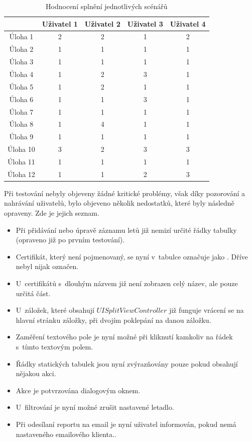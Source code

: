 \documentclass[thesis=M,czech]{FITthesis}[2012/06/26]
\begin{document}
\begin{table}\centering
 \begin{tabular}{ c | c | c | c | c |}
 	 & Uživatel 1 & Uživatel 2 & Uživatel 3 & Uživatel 4 \\
 	\hline
 	Úloha 1  & 2 & 2 & 1 & 2 \\
 	Úloha 2  & 1 & 1 & 1 & 1 \\
 	Úloha 3  & 1 & 1 & 1 & 1 \\
 	Úloha 4  & 1 & 2 & 3 & 1 \\
 	Úloha 5  & 1 & 2 & 1 & 1 \\
 	Úloha 6  & 1 & 1 & 3 & 1 \\
 	Úloha 7  & 1 & 1 & 1 & 1 \\
 	Úloha 8  & 1 & 4 & 1 & 1 \\
 	Úloha 9  & 1 & 1 & 1 & 1 \\
 	Úloha 10 & 3 & 2 & 3 & 3 \\
 	Úloha 11 & 1 & 1 & 1 & 1 \\
 	Úloha 12 & 1 & 1 & 2 & 3 \\
 \end{tabular}
 \caption[Hodnocení splnění jednotlivých scénářů]{Hodnocení splnění jednotlivých scénářů}\label{tab:ut_eval}
\end{table}

Při testování nebyly objeveny žádné kritické problémy, však díky pozorování a nahrávání uživatelů, bylo objeveno několik nedostatků, které byly následně opraveny. Zde je jejich seznam.

\begin{itemize}
\item Při přidávání nebo úpravě záznamu letů již nemizí určité řádky tabulky (opraveno již po prvním testování).
\item Certifikát, který není pojmenovaný, se nyní v~tabulce označuje jako . Dříve nebyl nijak označen.
\item U~certifikátů s~dlouhým názvem již není zobrazen celý název, ale pouze určitá část.
\item U~záložek, které obsahují $UISplitViewController$ již funguje vrácení se na hlavní stránku záložky, při dvojím poklepání na danou záložku.
\item Zaměření textového pole je nyní možné při kliknutí kamkoliv na řádek s~tímto textovým polem.
\item Řádky statických tabulek jsou nyní zvýrazňovány pouze pokud obsahují nějakou akci.
\item Akce  je potvrzována dialogovým oknem.
\item U~filtrování je nyní možné zrušit nastavené letadlo.
\item Při odesílaní reportu na email je nyní uživatel informován, pokud nemá nastaveného emailového klienta..
\end{itemize}
\end{document}
